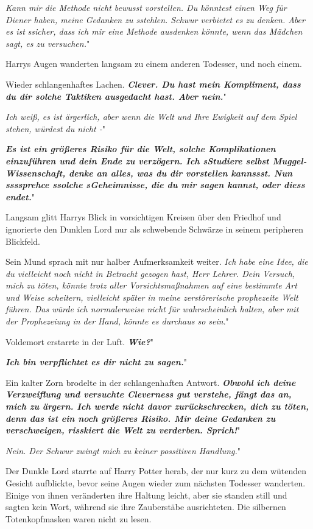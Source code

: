 \glqq \emph{Kann mir die Methode nicht bewusst vorstellen. Du könntest einen Weg
für Diener haben, meine Gedanken zu sstehlen. Schwur verbietet es zu denken.
Aber es ist }\emph{ssicher, dass ich mir eine Methode ausdenken könnte, wenn das
Mädchen sagt, es zu versuchen.}"

Harrys Augen wanderten langsam zu einem anderen Todesser, und noch einem.

Wieder schlangenhaftes Lachen. \glqq \textbf{\emph{Clever. Du hast mein
Kompliment, dass du dir solche Taktiken ausgedacht hast. Aber nein.}}"

\glqq \emph{Ich weiß, es ist ärgerlich, aber wenn die Welt und Ihre Ewigkeit auf
dem Spiel stehen, würdest du nicht -}"

\glqq \textbf{\emph{Es ist ein größeres Risiko für die Welt, solche
Komplikationen einzuführen und dein Ende zu verzögern. Ich sStudiere selbst
Muggel-Wissenschaft, denke an alles, was du dir vorstellen kannssst. Nun
ssssprehce ssolche sGeheimnisse, die du mir sagen kannst, oder diess endet.}}"

Langsam glitt Harrys Blick in vorsichtigen Kreisen über den Friedhof und
ignorierte den Dunklen Lord nur als schwebende Schwärze in seinem peripheren
Blickfeld.

Sein Mund sprach mit nur halber Aufmerksamkeit weiter. \glqq \emph{Ich habe eine
Idee, die du vielleicht noch nicht in Betracht gezogen hast, Herr Lehrer. Dein
Versuch, mich zu töten, könnte trotz aller Vorsichtsmaßnahmen auf eine bestimmte
Art und Weise scheitern, vielleicht später in meine zerstörerische prophezeite
Welt führen. Das würde ich normalerweise nicht für wahrscheinlich halten, aber
mit der Prophezeiung in der Hand, könnte es durchaus so sein}."

Voldemort erstarrte in der Luft. \glqq \textbf{\emph{Wie?}}"

\glqq \textbf{\emph{Ich bin verpflichtet es dir nicht zu sagen.}}"

Ein kalter Zorn brodelte in der schlangenhaften Antwort. \glqq
\textbf{\emph{Obwohl ich deine Verzweiflung und versuchte Cleverness gut
verstehe, fängt das an, mich zu ärgern. Ich werde nicht davor zurückschrecken,
dich zu töten, denn das ist ein noch größeres Risiko. Mir deine Gedanken zu
verschweigen, risskiert die Welt zu verderben. Sprich!}}"

\glqq \emph{Nein. Der Schwur zwingt mich zu keiner possitiven Handlung.}"

Der Dunkle Lord starrte auf Harry Potter herab, der nur kurz zu dem wütenden
Gesicht aufblickte, bevor seine Augen wieder zum nächsten Todesser wanderten.
Einige von ihnen veränderten ihre Haltung leicht, aber sie standen still und
sagten kein Wort, während sie ihre Zauberstäbe ausrichteten. Die silbernen
Totenkopfmasken waren nicht zu lesen.

